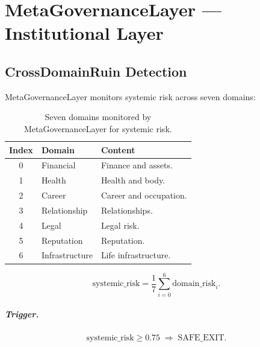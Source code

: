 
\chapter{MetaGovernanceLayer --- Institutional Layer}
\label{ch:meta-governance}

\section{CrossDomainRuin Detection}
\label{sec:cross-domain-ruin}

MetaGovernanceLayer monitors systemic risk across seven domains:

\begin{table}[ht]
\centering
\small
\begin{tabularx}{\linewidth}{cXX}
\toprule
\textbf{Index} & \textbf{Domain} & \textbf{Content} \\
\midrule
0 & Financial & Finance and assets. \\
1 & Health & Health and body. \\
2 & Career & Career and occupation. \\
3 & Relationship & Relationships. \\
4 & Legal & Legal risk. \\
5 & Reputation & Reputation. \\
6 & Infrastructure & Life infrastructure. \\
\bottomrule
\end{tabularx}
\caption[Cross-domain risk monitoring]{Seven domains monitored by
MetaGovernanceLayer for systemic risk.}
\label{tab:cross-domain-domains}
\end{table}

\begin{equation}
\mathrm{systemic\_risk} =
\frac{1}{7} \sum_{i=0}^{6} \mathrm{domain\_risk}_i.
\label{eq:systemic-risk}
\end{equation}

\paragraph{Trigger.}

\begin{equation}
\mathrm{systemic\_risk} \ge 0.75 \;\Rightarrow\; \mathrm{SAFE\_EXIT}.
\label{eq:cross-domain-trigger}
\end{equation}

